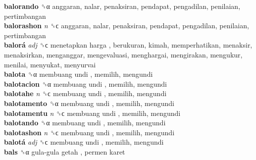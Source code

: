 \textbf{balorando} ␝α  anggaran, nalar, penaksiran, pendapat, pengadilan, penilaian, pertimbangan  \\
\textbf{balorashon} \emph{n}  ␝ϲ  anggaran, nalar, penaksiran, pendapat, pengadilan, penilaian, pertimbangan  \\
\textbf{balorá} \emph{adj}  ␝ϲ   menetapkan harga , berukuran, kimah, memperhatikan, menaksir, menaksirkan, menganggar, mengevaluasi, menghargai, mengirakan, mengukur, menilai, menyukat, menyurvai  \\
\textbf{balota} ␝α   membuang undi , memilih, mengundi  \\
\textbf{balotacion} ␝α   membuang undi , memilih, mengundi  \\
\textbf{balotahe} \emph{n}  ␝ϲ   membuang undi , memilih, mengundi  \\
\textbf{balotamento} ␝α   membuang undi , memilih, mengundi  \\
\textbf{balotamentu} \emph{n}  ␝ϲ   membuang undi , memilih, mengundi  \\
\textbf{balotando} ␝α   membuang undi , memilih, mengundi  \\
\textbf{balotashon} \emph{n}  ␝ϲ   membuang undi , memilih, mengundi  \\
\textbf{balotá} \emph{adj}  ␝ϲ   membuang undi , memilih, mengundi  \\
\textbf{bals} ␝α   gula-gula getah ,  permen karet   \\

